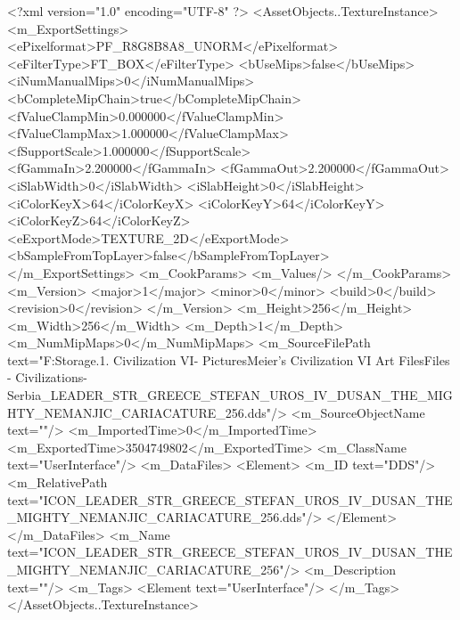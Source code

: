 <?xml version="1.0" encoding="UTF-8" ?>
<AssetObjects..TextureInstance>
	<m_ExportSettings>
		<ePixelformat>PF_R8G8B8A8_UNORM</ePixelformat>
		<eFilterType>FT_BOX</eFilterType>
		<bUseMips>false</bUseMips>
		<iNumManualMips>0</iNumManualMips>
		<bCompleteMipChain>true</bCompleteMipChain>
		<fValueClampMin>0.000000</fValueClampMin>
		<fValueClampMax>1.000000</fValueClampMax>
		<fSupportScale>1.000000</fSupportScale>
		<fGammaIn>2.200000</fGammaIn>
		<fGammaOut>2.200000</fGammaOut>
		<iSlabWidth>0</iSlabWidth>
		<iSlabHeight>0</iSlabHeight>
		<iColorKeyX>64</iColorKeyX>
		<iColorKeyY>64</iColorKeyY>
		<iColorKeyZ>64</iColorKeyZ>
		<eExportMode>TEXTURE_2D</eExportMode>
		<bSampleFromTopLayer>false</bSampleFromTopLayer>
	</m_ExportSettings>
	<m_CookParams>
		<m_Values/>
	</m_CookParams>
	<m_Version>
		<major>1</major>
		<minor>0</minor>
		<build>0</build>
		<revision>0</revision>
	</m_Version>
	<m_Height>256</m_Height>
	<m_Width>256</m_Width>
	<m_Depth>1</m_Depth>
	<m_NumMipMaps>0</m_NumMipMaps>
	<m_SourceFilePath text="F:\Mod Storage\2.1. Civilization VI\Mods\Archive - Pictures\Sid Meier's Civilization VI Art Files\Art Files - Civilizations\Civilization - Serbia\ICON_LEADER_STR_GREECE_STEFAN_UROS_IV_DUSAN_THE_MIGHTY_NEMANJIC_CARIACATURE_256.dds"/>
	<m_SourceObjectName text=""/>
	<m_ImportedTime>0</m_ImportedTime>
	<m_ExportedTime>3504749802</m_ExportedTime>
	<m_ClassName text="UserInterface"/>
	<m_DataFiles>
		<Element>
			<m_ID text="DDS"/>
			<m_RelativePath text="ICON_LEADER_STR_GREECE_STEFAN_UROS_IV_DUSAN_THE_MIGHTY_NEMANJIC_CARIACATURE_256.dds"/>
		</Element>
	</m_DataFiles>
	<m_Name text="ICON_LEADER_STR_GREECE_STEFAN_UROS_IV_DUSAN_THE_MIGHTY_NEMANJIC_CARIACATURE_256"/>
	<m_Description text=""/>
	<m_Tags>
		<Element text="UserInterface"/>
	</m_Tags>
</AssetObjects..TextureInstance>

